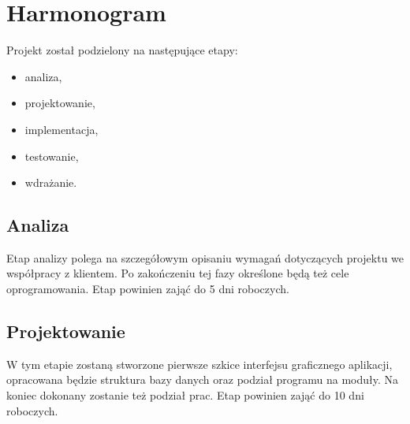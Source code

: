\documentclass [11pt, a4paper, leqno] {article}
\begin{document}


\section{Harmonogram}
\noindent
Projekt został podzielony na następujące etapy:
\begin{itemize}
\item analiza,
\item projektowanie,
\item implementacja,
\item testowanie,
\item wdrażanie.
\end{itemize}

\subsection{Analiza}
\noindent
Etap analizy polega na szczegółowym opisaniu wymagań dotyczących projektu we współpracy z klientem. Po zakończeniu tej fazy określone będą też cele oprogramowania. Etap powinien zająć do 5 dni roboczych.

\subsection{Projektowanie}
\noindent
W tym etapie zostaną stworzone pierwsze szkice interfejsu graficznego aplikacji, opracowana będzie struktura bazy danych oraz podział programu na moduły. Na koniec dokonany zostanie też podział prac. Etap powinien zająć do 10 dni roboczych.
\end{document}
